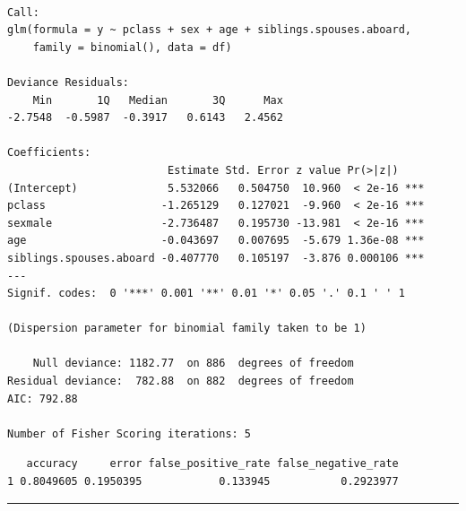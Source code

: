 \documentclass[
  letterpaper,
  DIV=11,
  numbers=noendperiod]{scrartcl}
\newenvironment{Shaded}{\begin{snugshade}}{\end{snugshade}}
\newcommand{\AttributeTok}[1]{\textcolor[rgb]{0.40,0.45,0.13}{#1}}
\newcommand{\DecValTok}[1]{\textcolor[rgb]{0.68,0.00,0.00}{#1}}
\newcommand{\FloatTok}[1]{\textcolor[rgb]{0.68,0.00,0.00}{#1}}
\newcommand{\FunctionTok}[1]{\textcolor[rgb]{0.28,0.35,0.67}{#1}}
\newcommand{\NormalTok}[1]{\textcolor[rgb]{0.00,0.23,0.31}{#1}}
\newcommand{\OtherTok}[1]{\textcolor[rgb]{0.00,0.23,0.31}{#1}}
\newcommand{\SpecialCharTok}[1]{\textcolor[rgb]{0.37,0.37,0.37}{#1}}
\newcommand{\StringTok}[1]{\textcolor[rgb]{0.13,0.47,0.30}{#1}}
\begin{document}
\begin{verbatim}

Call:
glm(formula = y ~ pclass + sex + age + siblings.spouses.aboard, 
    family = binomial(), data = df)

Deviance Residuals: 
    Min       1Q   Median       3Q      Max  
-2.7548  -0.5987  -0.3917   0.6143   2.4562  

Coefficients:
                         Estimate Std. Error z value Pr(>|z|)    
(Intercept)              5.532066   0.504750  10.960  < 2e-16 ***
pclass                  -1.265129   0.127021  -9.960  < 2e-16 ***
sexmale                 -2.736487   0.195730 -13.981  < 2e-16 ***
age                     -0.043697   0.007695  -5.679 1.36e-08 ***
siblings.spouses.aboard -0.407770   0.105197  -3.876 0.000106 ***
---
Signif. codes:  0 '***' 0.001 '**' 0.01 '*' 0.05 '.' 0.1 ' ' 1

(Dispersion parameter for binomial family taken to be 1)

    Null deviance: 1182.77  on 886  degrees of freedom
Residual deviance:  782.88  on 882  degrees of freedom
AIC: 792.88

Number of Fisher Scoring iterations: 5
\end{verbatim}

\begin{Shaded}
\end{Shaded}

\begin{verbatim}
   accuracy     error false_positive_rate false_negative_rate
1 0.8049605 0.1950395            0.133945           0.2923977
\end{verbatim}

\begin{center}\rule{0.5\linewidth}{0.5pt}\end{center}
\end{document}
